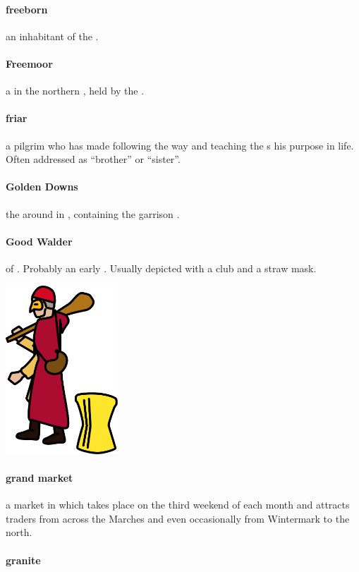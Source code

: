 \paragraph{freeborn} an inhabitant of the .
\paragraph{Freemoor} a  in the northern , held by the .
\paragraph{friar} a pilgrim who has made following the way and teaching the s his purpose in life. Often addressed as “brother” or “sister”.
\paragraph{Golden Downs} the  around  in , containing the garrison .
\paragraph{Good Walder}  of . Probably an early . Usually depicted with a club and a straw mask. \begin{center}\includegraphics[width=4.2cm]{encyclopedia/Walder} \end{center}
\paragraph{grand market} a market in  which takes place on the third weekend of each month and attracts traders from across the Marches and even occasionally from Wintermark to the north. 
\paragraph{granite} 
